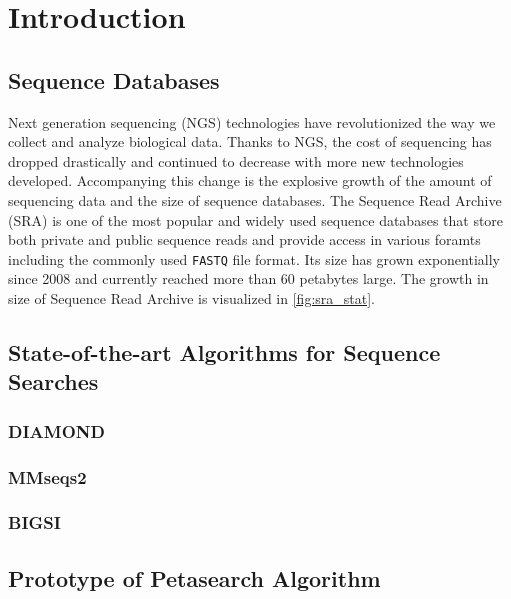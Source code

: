 
\chapter{Introduction}


\section{Sequence Databases}

Next generation sequencing (NGS) technologies have revolutionized the way we collect and analyze biological data. Thanks to NGS, the cost of sequencing has dropped drastically and continued to decrease with more new technologies developed. Accompanying this change is the explosive growth of the amount of sequencing data and the size of sequence databases. The Sequence Read Archive (SRA) is one of the most popular and widely used sequence databases that store both private and public sequence reads and provide access in various foramts including the commonly used \texttt{FASTQ} file format. Its size has grown exponentially since 2008 and currently reached more than 60 petabytes large. The growth in size of Sequence Read Archive is visualized in \autoref{fig:sra_stat}.



\section{State-of-the-art Algorithms for Sequence Searches}

\subsection{DIAMOND}

\subsection{MMseqs2}

\subsection{BIGSI}

\section{Prototype of Petasearch Algorithm}

